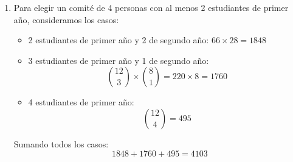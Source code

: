 \documentclass[answers]{exam} %
\begin{document}
\begin{questions}
\begin{solution}
\begin{enumerate}[label=\alph*.]
            \item Para elegir un comité de 4 personas con al menos 2 estudiantes de primer año, consideramos los casos:
                  \begin{itemize}
                      \item 2 estudiantes de primer año y 2 de segundo año: \(66 \times 28 = 1848\)
                      \item 3 estudiantes de primer año y 1 de segundo año:
                            \[
                                \binom{12}{3} \times \binom{8}{1} = 220 \times 8 = 1760
                            \]
                      \item 4 estudiantes de primer año:
                            \[
                                \binom{12}{4} = 495
                            \]
                  \end{itemize}
                  Sumando todos los casos:
                  \[
                      1848 + 1760 + 495 = 4103
                  \]
        \end{enumerate}
    \end{solution}

    \vspace{0.5cm}

\end{questions}
\end{document}
